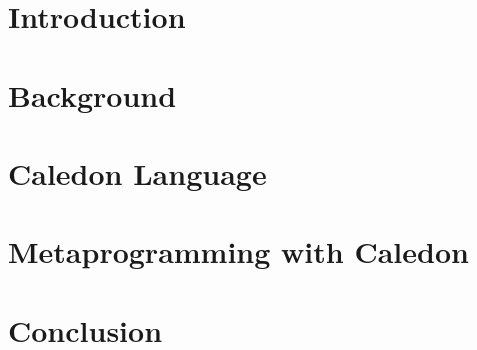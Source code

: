 \documentclass[12pt]{cmuthesis}
\begin{document}
\chapter{Introduction}
    

\chapter{Background}
    
    
    
    
    

\chapter{Caledon Language}
    
    
    
    

\chapter{Metaprogramming with Caledon}

    
    
    
    


\chapter{Conclusion}
   
   
   
\appendix


\backmatter


\renewcommand{\bibsection}{\chapter{\bibname}}

\nocite{*}
\end{document}
